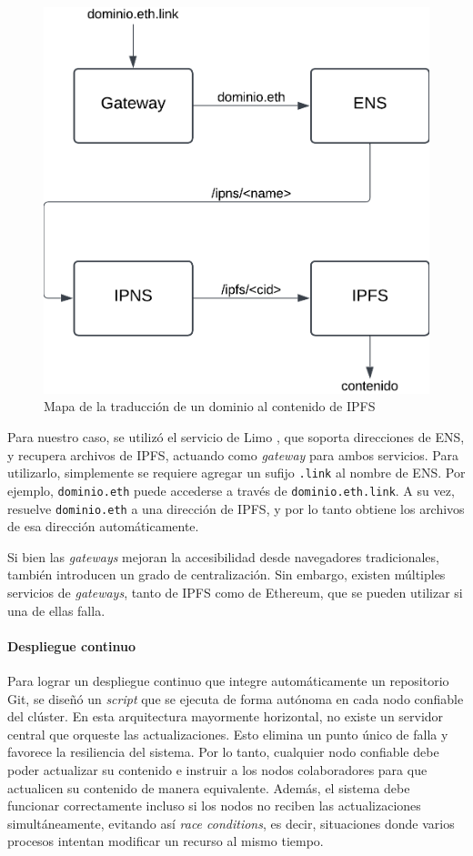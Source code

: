 \begin{figure}[H]
    \centering
    \includegraphics[width=0.5\linewidth]{img/solucion-ipfs/traduccion-dominio.png}
    \caption{Mapa de la traducción de un dominio al contenido de IPFS}
    \label{fig:traduccion-ipfs}
\end{figure}

Para nuestro caso, se utilizó el servicio de Limo \cite{limo}, que soporta direcciones de ENS, y recupera archivos de IPFS, actuando como \textit{gateway} para ambos servicios. Para utilizarlo, simplemente se requiere agregar un sufijo \texttt{.link} al nombre de ENS. Por ejemplo, \texttt{dominio.eth} puede accederse a través de \texttt{dominio.eth.link}. A su vez, resuelve \texttt{dominio.eth} a una dirección de IPFS, y por lo tanto obtiene los archivos de esa dirección automáticamente.

Si bien las \textit{gateways} mejoran la accesibilidad desde navegadores tradicionales, también introducen un grado de centralización. Sin embargo, existen múltiples servicios de \textit{gateways}, tanto de IPFS como de Ethereum, que se pueden utilizar si una de ellas falla.

\paragraph{Despliegue continuo}

Para lograr un despliegue continuo que integre automáticamente un repositorio Git, se diseñó un \textit{script} que se ejecuta de forma autónoma en cada nodo confiable del clúster. En esta arquitectura mayormente horizontal, no existe un servidor central que orqueste las actualizaciones. Esto elimina un punto único de falla y favorece la resiliencia del sistema. Por lo tanto, cualquier nodo confiable debe poder actualizar su contenido e instruir a los nodos colaboradores para que actualicen su contenido de manera equivalente. Además, el sistema debe funcionar correctamente incluso si los nodos no reciben las actualizaciones simultáneamente, evitando así \textit{race conditions}, es decir, situaciones donde varios procesos intentan modificar un recurso al mismo tiempo.

